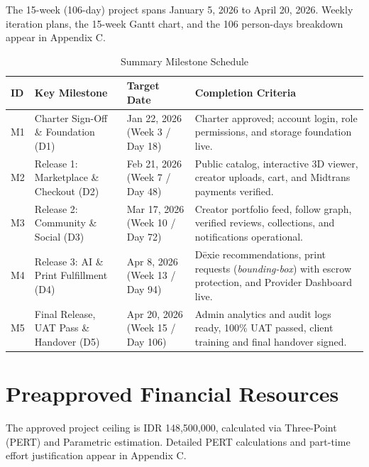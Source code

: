 \documentclass[11pt,a4paper]{article}
\newcommand{\thdr}[1]{\centering\arraybackslash\textbf{#1}}
\begin{document}
The 15-week (106-day) project spans January 5, 2026 to April 20, 2026. Weekly iteration plans, the 15-week Gantt chart, and the 106 person-days breakdown appear in Appendix C.

\begin{table}[H]
\centering
\caption{Summary Milestone Schedule}
\begin{tabularx}{\textwidth}{| C{1.1cm} | L{4.3cm} | C{2.9cm} | Y |}
\hline
{} \thdr{ID} & \thdr{Key Milestone} & \thdr{Target Date} & \thdr{Completion Criteria} \\
\hline
M1 & Charter Sign-Off \& Foundation (D1) & Jan 22, 2026 (Week 3 / Day 18) & Charter approved; account login, role permissions, and storage foundation live. \\
\hline
M2 & Release 1: Marketplace \& Checkout (D2) & Feb 21, 2026 (Week 7 / Day 48) & Public catalog, interactive 3D viewer, creator uploads, cart, and Midtrans payments verified. \\
\hline
M3 & Release 2: Community \& Social (D3) & Mar 17, 2026 (Week 10 / Day 72) & Creator portfolio feed, follow graph, verified reviews, collections, and notifications operational. \\
\hline
M4 & Release 3: AI \& Print Fulfillment (D4) & Apr 8, 2026 (Week 13 / Day 94) & D\={e}xie recommendations, print requests (\textit{bounding-box}) with escrow protection, and Provider Dashboard live. \\
\hline
M5 & Final Release, UAT Pass \& Handover (D5) & Apr 20, 2026 (Week 15 / Day 106) & Admin analytics and audit logs ready, 100\% UAT passed, client training and final handover signed. \\
\hline
\end{tabularx}
\end{table}

\clearpage
\section{Preapproved Financial Resources}

The approved project ceiling is IDR 148,500,000, calculated via Three-Point (PERT) and Parametric estimation. Detailed PERT calculations and part-time effort justification appear in Appendix C.
\end{document}
